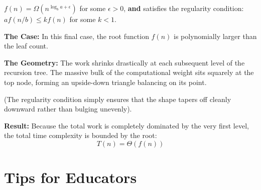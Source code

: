 \documentclass[11pt, a4paper]{article}
\begin{document}
\begin{tcolorbox}[colback=accent2!10, colframe=accent2, title=\textbf{Condition}]
$f(n) = \Omega(n^{\log_b a + \epsilon})$ for some $\epsilon > 0$, \textbf{and} satisfies the regularity condition: $a f(n/b) \le k f(n)$ for some $k < 1$.
\end{tcolorbox}

\textbf{The Case:} In this final case, the root function $f(n)$ is polynomially larger than the leaf count.

\textbf{The Geometry:}  The work shrinks drastically at each subsequent level of the recursion tree. The massive bulk of the computational weight sits squarely at the top node, forming an upside-down triangle balancing on its point. 

(The regularity condition simply ensures that the shape tapers off cleanly downward rather than bulging unevenly).

\textbf{Result:} Because the total work is completely dominated by the very first level, the total time complexity is bounded by the root:
\begin{equation*}
    T(n) = \Theta(f(n))
\end{equation*}

\vspace{0.5cm}
\begin{center}
\end{center}


\section*{Tips for Educators}
\end{document}
